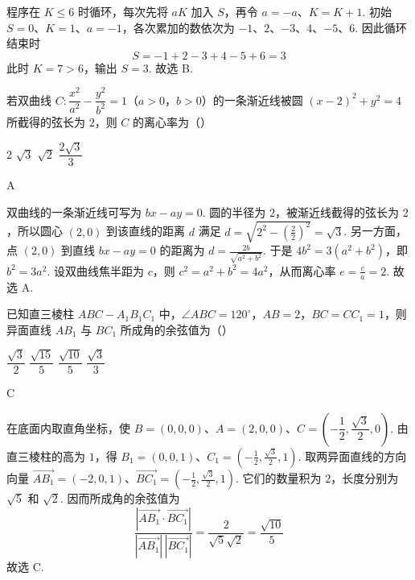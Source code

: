 \begin{solution}
程序在 \(K\le6\) 时循环，每次先将 \(aK\) 加入 \(S\)，再令 \(a=-a\)、\(K=K+1\). 初始 \(S=0\)、\(K=1\)、\(a=-1\)，各次累加的数依次为
\(-1\)、\(2\)、\(-3\)、\(4\)、\(-5\)、\(6\).
因此循环结束时
\[
S=-1+2-3+4-5+6=3
\]
此时 \(K=7>6\)，输出 \(S=3\). 故选 B.
\end{solution}

\begin{problem}
若双曲线 \(C:\dfrac{x^2}{a^2}-\dfrac{y^2}{b^2}=1\)（\(a>0\)，\(b>0\)）的一条渐近线被圆 \((x-2)^2+y^2=4\) 所截得的弦长为 \(2\)，则 \(C\) 的离心率为（\quad）

\choices
    {\(2\)}
    {\(\sqrt3\)}
    {\(\sqrt2\)}
    {\(\dfrac{2\sqrt3}{3}\)}
\end{problem}

\begin{answer}
A
\end{answer}

\begin{solution}
双曲线的一条渐近线可写为 \(bx-ay=0\). 圆的半径为 \(2\)，被渐近线截得的弦长为 \(2\)，所以圆心 \((2,0)\) 到该直线的距离 \(d\) 满足
\(d=\sqrt{2^2-\left(\frac{2}{2}\right)^2}=\sqrt3\).
另一方面，点 \((2,0)\) 到直线 \(bx-ay=0\) 的距离为
\(d=\frac{2b}{\sqrt{a^2+b^2}}\).
于是 \(4b^2=3(a^2+b^2)\)，即 \(b^2=3a^2\). 设双曲线焦半距为 \(c\)，则 \(c^2=a^2+b^2=4a^2\)，从而离心率
\(e=\frac ca=2\).
故选 A.
\end{solution}

\begin{problem}
已知直三棱柱 \(ABC-A_1B_1C_1\) 中，\(\angle ABC=120^\circ\)，\(AB=2\)，\(BC=CC_1=1\)，则异面直线 \(AB_1\) 与 \(BC_1\) 所成角的余弦值为（\quad）

\choices
    {\(\dfrac{\sqrt3}{2}\)}
    {\(\dfrac{\sqrt{15}}{5}\)}
    {\(\dfrac{\sqrt{10}}{5}\)}
    {\(\dfrac{\sqrt3}{3}\)}
\end{problem}

\begin{answer}
C
\end{answer}

\begin{solution}
在底面内取直角坐标，使 \(B=(0,0,0)\)、\(A=(2,0,0)\)、\(C=\left(-\dfrac12,\dfrac{\sqrt3}{2},0\right)\). 由直三棱柱的高为 \(1\)，得 \(B_1=(0,0,1)\)、\(C_1=\left(-\frac12,\frac{\sqrt3}{2},1\right)\).
取两异面直线的方向向量
\(\overrightarrow{AB_1}=(-2,0,1)\)、\(\overrightarrow{BC_1}=\left(-\frac12,\frac{\sqrt3}{2},1\right)\).
它们的数量积为 \(2\)，长度分别为 \(\sqrt5\) 和 \(\sqrt2\). 因而所成角的余弦值为
\[
\frac{|\overrightarrow{AB_1}\cdot\overrightarrow{BC_1}|}{|\overrightarrow{AB_1}|\,|\overrightarrow{BC_1}|}
=\frac{2}{\sqrt5\sqrt2}=\frac{\sqrt{10}}5
\]
故选 C.
\end{solution}

